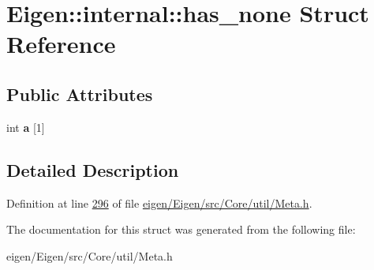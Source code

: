 \hypertarget{struct_eigen_1_1internal_1_1has__none}{}\section{Eigen\+:\+:internal\+:\+:has\+\_\+none Struct Reference}
\label{struct_eigen_1_1internal_1_1has__none}
\subsection*{Public Attributes}
\begin{DoxyCompactItemize}
\item 
\mbox{\label{struct_eigen_1_1internal_1_1has__none_a8c0cb9fba95698e3a60d3e9f153bc732}} 
int {\bfseries a} \mbox{[}1\mbox{]}
\end{DoxyCompactItemize}


\subsection{Detailed Description}


Definition at line \hyperlink{eigen_2_eigen_2src_2_core_2util_2_meta_8h_source_l00296}{296} of file \hyperlink{eigen_2_eigen_2src_2_core_2util_2_meta_8h_source}{eigen/\+Eigen/src/\+Core/util/\+Meta.\+h}.



The documentation for this struct was generated from the following file\+:\begin{DoxyCompactItemize}
\item 
eigen/\+Eigen/src/\+Core/util/\+Meta.\+h\end{DoxyCompactItemize}
